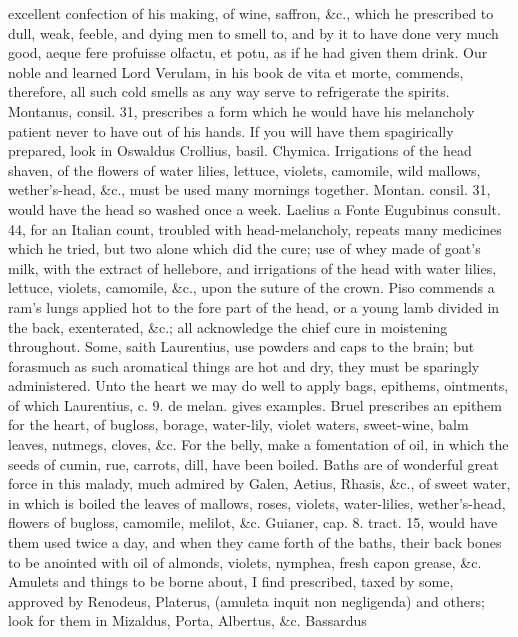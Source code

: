 excellent confection of his making, of wine, saffron, \&c., which he
prescribed to dull, weak, feeble, and dying men to smell to, and by it
to have done very much good, aeque fere profuisse olfactu, et potu, as
if he had given them drink. Our noble and learned Lord Verulam,
in his book de vita et morte, commends, therefore, all such cold smells
as any way serve to refrigerate the spirits. Montanus, consil. 31,
prescribes a form which he would have his melancholy patient never to
have out of his hands. If you will have them spagirically prepared,
look in Oswaldus Crollius, basil. Chymica.
Irrigations of the head shaven, of the flowers of water lilies,
lettuce, violets, camomile, wild mallows, wether's-head, \&c., must be
used many mornings together. Montan. consil. 31, would have the head so
washed once a week. Laelius a Fonte Eugubinus consult. 44, for an
Italian count, troubled with head-melancholy, repeats many medicines
which he tried, but two alone which did the cure; use of whey
made of goat's milk, with the extract of hellebore, and irrigations of
the head with water lilies, lettuce, violets, camomile, \&c., upon the
suture of the crown. Piso commends a ram's lungs applied hot to the
fore part of the head, or a young lamb divided in the back,
exenterated, \&c.; all acknowledge the chief cure in moistening
throughout. Some, saith Laurentius, use powders and caps to the brain;
but forasmuch as such aromatical things are hot and dry, they must be
sparingly administered.
Unto the heart we may do well to apply bags, epithems, ointments, of
which Laurentius, c. 9. de melan. gives examples. Bruel prescribes an
epithem for the heart, of bugloss, borage, water-lily, violet waters,
sweet-wine, balm leaves, nutmegs, cloves, \&c.
For the belly, make a fomentation of oil, in which the seeds of
cumin, rue, carrots, dill, have been boiled.
Baths are of wonderful great force in this malady, much admired by
 Galen, Aetius, Rhasis, \&c., of sweet water, in which is
boiled the leaves of mallows, roses, violets, water-lilies,
wether's-head, flowers of bugloss, camomile, melilot, \&c. Guianer, cap.
8. tract. 15, would have them used twice a day, and when they came
forth of the baths, their back bones to be anointed with oil of
almonds, violets, nymphea, fresh capon grease, \&c.
Amulets and things to be borne about, I find prescribed, taxed by some,
approved by Renodeus, Platerus, (amuleta inquit non negligenda) and
others; look for them in Mizaldus, Porta, Albertus, \&c. Bassardus

